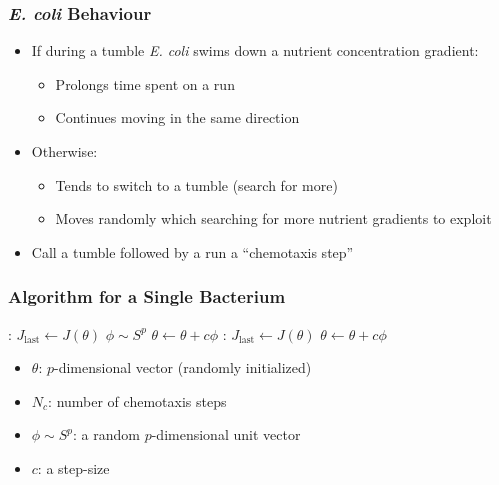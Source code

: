 \documentclass{beamer}
\begin{document}
\begin{frame}
\frametitle{\textit{\textit{E. coli}} Behaviour}
\begin{itemize}
  \item<1-> If during a tumble \textit{\textit{E. coli}} swims down a nutrient concentration gradient:
  \begin{itemize}
    \item<1-> Prolongs time spent on a run
    \item<1-> Continues moving in the same direction
  \end{itemize}
  \item<2-> Otherwise:
  \begin{itemize}
    \item<2-> Tends to switch to a tumble (search for more)
    \item<2-> Moves randomly which searching for more nutrient gradients to exploit
  \end{itemize}
  \item<3-> Call a tumble followed by a run a ``chemotaxis step''
\end{itemize}
\end{frame}

\begin{frame}
\frametitle{Algorithm for a Single Bacterium}
\begin{algorithmic}[1]
:
  \State $J_\text{last} \gets J(\theta)$
  \State $\phi \sim S^p$
  \State $\theta \gets \theta + c \phi$
  :
    \State $J_\text{last} \gets J(\theta)$
    \State $\theta \gets \theta + c \phi$
  \EndWhile
\EndFor
\end{algorithmic}
\begin{itemize}
  \item $\theta$: $p$-dimensional vector (randomly initialized)
  \item $N_c$: number of chemotaxis steps
  \item $\phi \sim S^p$: a random $p$-dimensional unit vector
  \item $c$: a step-size
\end{itemize}
\end{frame}
\end{document}
